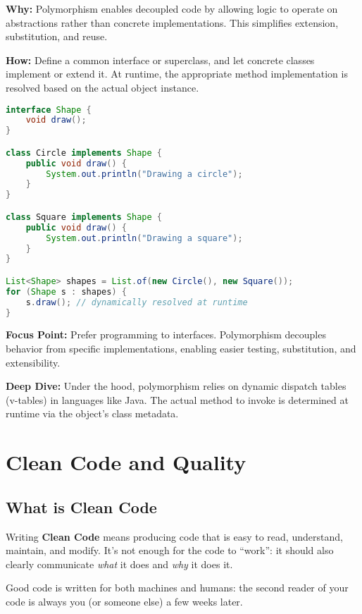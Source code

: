 \documentclass[a4paper,12pt]{article}
\begin{document}
\textbf{Why:} Polymorphism enables decoupled code by allowing logic to operate on abstractions rather than concrete implementations. This simplifies extension, substitution, and reuse.

\textbf{How:} Define a common interface or superclass, and let concrete classes implement or extend it. At runtime, the appropriate method implementation is resolved based on the actual object instance.

\begin{lstlisting}[language=Java]
interface Shape {
    void draw();
}

class Circle implements Shape {
    public void draw() {
        System.out.println("Drawing a circle");
    }
}

class Square implements Shape {
    public void draw() {
        System.out.println("Drawing a square");
    }
}

List<Shape> shapes = List.of(new Circle(), new Square());
for (Shape s : shapes) {
    s.draw(); // dynamically resolved at runtime
}
\end{lstlisting}

\textbf{Focus Point:} Prefer programming to interfaces. Polymorphism decouples behavior from specific implementations, enabling easier testing, substitution, and extensibility.

\textbf{Deep Dive:} Under the hood, polymorphism relies on dynamic dispatch tables (v-tables) in languages like Java. The actual method to invoke is determined at runtime via the object's class metadata.





\section{Clean Code and Quality}

\subsection{What is Clean Code}
Writing \textbf{Clean Code} means producing code that is easy to read, understand, maintain, and modify. It’s not enough for the code to “work”: it should also clearly communicate \emph{what} it does and \emph{why} it does it.

Good code is written for both machines and humans: the second reader of your code is always you (or someone else) a few weeks later.
\end{document}
